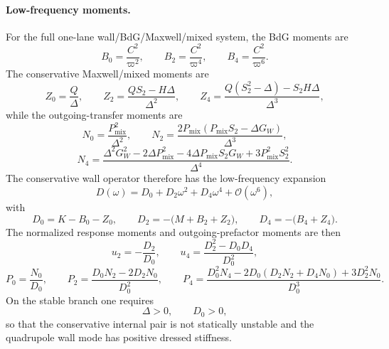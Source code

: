 \documentclass[11pt]{article}
\theoremstyle{definition}
\newcommand{\cO}{\mathcal O}
\begin{document}
\paragraph{Low-frequency moments.}
For the full one-lane wall/BdG/Maxwell/mixed system, the BdG moments are
\begin{equation}
 B_0=\frac{C^2}{\varpi^2},
 \qquad
 B_2=\frac{C^2}{\varpi^4},
 \qquad
 B_4=\frac{C^2}{\varpi^6}.
 \label{eq:app-one-lane-b-moments}
\end{equation}
The conservative Maxwell/mixed moments are
\begin{equation}
 Z_0=\frac{Q}{\Delta},
 \qquad
 Z_2=\frac{Q S_2 - H\Delta}{\Delta^2},
 \qquad
 Z_4=\frac{Q(S_2^2-\Delta)-S_2 H\Delta}{\Delta^3},
 \label{eq:app-one-lane-z-moments}
\end{equation}
while the outgoing-transfer moments are
\begin{equation}
 N_0=\frac{P_{\mathrm{mix}}^2}{\Delta^2},
 \qquad
 N_2=\frac{2P_{\mathrm{mix}}(P_{\mathrm{mix}}S_2-\Delta G_W)}{\Delta^3},
 \label{eq:app-one-lane-n0-n2}
\end{equation}
\begin{equation}
 N_4=
 \frac{\Delta^2 G_W^2 - 2\Delta P_{\mathrm{mix}}^2 - 4\Delta P_{\mathrm{mix}}S_2 G_W + 3P_{\mathrm{mix}}^2 S_2^2}{\Delta^4}.
 \label{eq:app-one-lane-n4}
\end{equation}
The conservative wall operator therefore has the low-frequency expansion
\begin{equation}
 D(\omega)=D_0 + D_2\omega^2 + D_4\omega^4 + \cO(\omega^6),
 \label{eq:app-one-lane-denominator-expansion}
\end{equation}
with
\begin{equation}
 D_0 = K-B_0-Z_0,
 \qquad
 D_2 = -\bigl(M+B_2+Z_2\bigr),
 \qquad
 D_4 = -\bigl(B_4+Z_4\bigr).
 \label{eq:app-one-lane-d-moments}
\end{equation}
The normalized response moments and outgoing-prefactor moments are then
\begin{equation}
 u_2=-\frac{D_2}{D_0},
 \qquad
 u_4=\frac{D_2^2-D_0D_4}{D_0^2},
 \label{eq:app-one-lane-u-moments}
\end{equation}
\begin{equation}
 P_0=\frac{N_0}{D_0},
 \qquad
 P_2=\frac{D_0N_2-2D_2N_0}{D_0^2},
 \qquad
 P_4=\frac{D_0^2N_4-2D_0(D_2N_2+D_4N_0)+3D_2^2N_0}{D_0^3}.
 \label{eq:app-one-lane-p-moments}
\end{equation}
On the stable branch one requires
\begin{equation}
 \Delta>0,
 \qquad
 D_0>0,
 \label{eq:app-one-lane-stability}
\end{equation}
so that the conservative internal pair is not statically unstable and the quadrupole wall mode has positive dressed stiffness.
\end{document}
